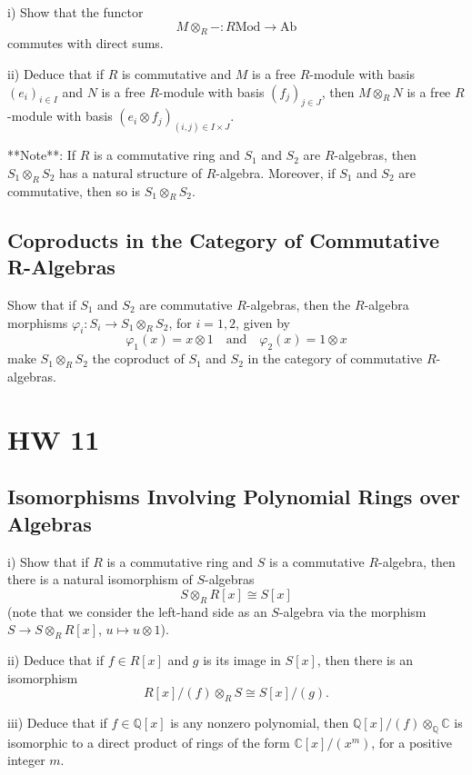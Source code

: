 \documentclass[lang=cn,11pt]{template}
\begin{document}
i) Show that the functor
\[
M \otimes_R - : R\text{Mod} \rightarrow \text{Ab}
\]
commutes with direct sums.

ii) Deduce that if \( R \) is commutative and \( M \) is a free \( R \)-module with basis \( (e_i)_{i \in I} \) and \( N \) is a free \( R \)-module with basis \( (f_j)_{j \in J} \), then \( M \otimes_R N \) is a free \( R \)-module with basis \( (e_i \otimes f_j)_{(i,j) \in I \times J} \).

**Note**: If \( R \) is a commutative ring and \( S_1 \) and \( S_2 \) are \( R \)-algebras, then \( S_1 \otimes_R S_2 \) has a natural structure of \( R \)-algebra. Moreover, if \( S_1 \) and \( S_2 \) are commutative, then so is \( S_1 \otimes_R S_2 \).

\section{Coproducts in the Category of Commutative R-Algebras}
Show that if \( S_1 \) and \( S_2 \) are commutative \( R \)-algebras, then the \( R \)-algebra morphisms \( \varphi_i : S_i \rightarrow S_1 \otimes_R S_2 \), for \( i = 1, 2 \), given by
\[
\varphi_1(x) = x \otimes 1 \quad \text{and} \quad \varphi_2(x) = 1 \otimes x
\]
make \( S_1 \otimes_R S_2 \) the coproduct of \( S_1 \) and \( S_2 \) in the category of commutative \( R \)-algebras.







\chapter{HW 11}

\section{Isomorphisms Involving Polynomial Rings over Algebras}
i) Show that if \( R \) is a commutative ring and \( S \) is a commutative \( R \)-algebra, then there is a natural isomorphism of \( S \)-algebras
\[
S \otimes_R R[x] \cong S[x]
\]
(note that we consider the left-hand side as an \( S \)-algebra via the morphism \( S \rightarrow S \otimes_R R[x] \), \( u \mapsto u \otimes 1 \)).

ii) Deduce that if \( f \in R[x] \) and \( g \) is its image in \( S[x] \), then there is an isomorphism
\[
R[x]/(f) \otimes_R S \cong S[x]/(g).
\]

iii) Deduce that if \( f \in \mathbb{Q}[x] \) is any nonzero polynomial, then \( \mathbb{Q}[x]/(f) \otimes_{\mathbb{Q}} \mathbb{C} \) is isomorphic to a direct product of rings of the form \( \mathbb{C}[x]/(x^m) \), for a positive integer \( m \).
\end{document}
